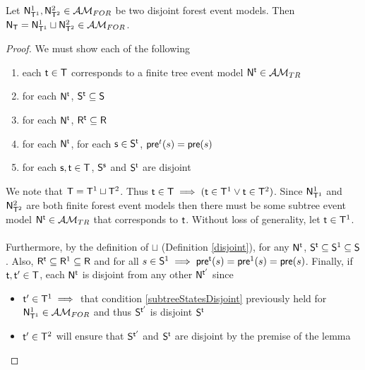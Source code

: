 \begin{lemma} \label{disjForestIsForest}
Let $\evM^1_{\evT^1}, \evM^2_{\evT^2} \in \forestClass$ be two disjoint forest event models.
Then $\evM_\evT = \evM^1_{\evT^1} \sqcup \evM^2_{\evT^2} \in \forestClass$.
\end{lemma}

\begin{proof}
We must show each of the following
\begin{enumerate}
	\item each $\evt \in \evT$ corresponds to a finite tree event model $\evM^\evt \in \treeClass$ \label{treeCorrespondence}
	\item for each $\evM^\evt$, $\evS^\evt \subseteq \evS$ \label{forestStateSubsets}
	\item for each $\evM^\evt$, $\evR^\evt \subseteq \evR$ \label{forestEdgeSubsets}
	\item for each $\evM^\evt$, for each $\evs \in \evS^\evt$, $\evpr^t(s) = \evpr(s)$ \label{preconMatch}
	\item for each $\evs, \evt \in \evT$, $\evS^\evs$ and $\evS^\evt$ are disjoint \label{subtreeStatesDisjoint}
\end{enumerate}

We note that $\evT = \evT^1 \sqcup \evT^2$.
Thus $\evt \in \evT \implies (\evt \in \evT^1 \lor \evt \in \evT^2)$.
Since $\evM^1_{\evT^1}$ and $\evM^2_{\evT^2}$ are both finite forest event models then there must be some
subtree event model $\evM^\evt \in \treeClass$ that corresponds to $\evt$.
Without loss of generality, let $\evt \in \evT^1$.\\
\\
Furthermore, by the definition of $\sqcup$ (Definition \ref{disjoint}), for any $\evM^\evt$, $\evS^\evt \subseteq \evS^1 \subseteq \evS$.
Also, $\evR^\evt \subseteq \evR^1 \subseteq \evR$ and for all $s \in \evS^1 \implies \evpr^\evt(s) = \evpr^1(s) =
\evpr(s)$.
Finally, if $\evt, \evt' \in \evT$, each $\evM^\evt$ is disjoint from any other $\evM^{\evt'}$ since
\begin{itemize}
	\item $\evt' \in \evT^1 \implies$ that condition \ref{subtreeStatesDisjoint} previously held for
	$\evM^1_{\evT^1} \in \forestClass$ and thus $\evS^{\evt'}$ is disjoint $\evS^\evt$
	\item $\evt' \in \evT^2$ will ensure that $\evS^{\evt'}$ and $\evS^\evt$ are disjoint by the premise of
	the lemma
\end{itemize}
\end{proof}


